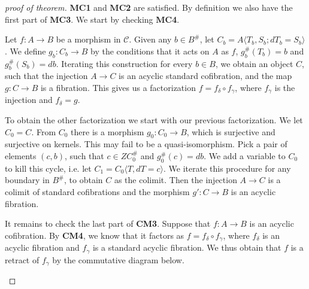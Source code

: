 \documentclass[../thesis.tex]{subfiles}
\begin{document}
            \begin{center}
            \end{center}

            \begin{proof}[proof of theorem]
                \textbf{MC1} and \textbf{MC2} are satisfied. By definition we also have the first part of \textbf{MC3}. We start by checking \textbf{MC4}.

                Let $f:A\rightarrow B$ be a morphism in $\mathcal{C}$. Given any $b\in B^\#$, let $C_b = A\langle T_b,S_b; dT_b = S_b\rangle$. We define $g_b: C_b \rightarrow B$ by the conditions that it acts on $A$ as $f$, $g_b^\#(T_b) = b$ and $g_b^\#(S_b)=db$. Iterating this construction for every $b\in B$, we obtain an object $C$, such that the injection $A \rightarrow C$ is an acyclic standard cofibration, and the map $g : C \rightarrow B$ is a fibration. This gives us a factorization $f = f_\delta\circ f_\gamma$, where $f_\gamma$ is the injection and $f_\delta = g$.

                To obtain the other factorization we start with our previous factorization. We let $C_0 = C$. From $C_0$ there is a morphism $g_0 : C_0 \rightarrow B$, which is surjective and surjective on kernels. This may fail to be a quasi-isomorphism. Pick a pair of elements $(c,b)$, such that $c\in ZC_0^\#$ and $g_0^\#(c) = db$. We add a variable to $C_0$ to kill this cycle, i.e. let $C_1 = C_0\langle T, dT = c\rangle$. We iterate this procedure for any boundary in $B^\#$, to obtain $C$ as the colimit. Then the injection $A \rightarrow C$ is a colimit of standard cofibrations and the morphism $g' : C \rightarrow B$ is an acyclic fibration.
                
                It remains to check the last part of \textbf{CM3}. Suppose that $f:A\rightarrow B$ is an acyclic cofibration. By \textbf{CM4}, we know that it factors as $f = f_\delta \circ f_\gamma$, where $f_\delta$ is an acyclic fibration and $f_\gamma$ is a standard acyclic fibration. We thus obtain that $f$ is a retract of $f_\gamma$ by the commutative diagram below.
                \begin{center}
                \end{center}
            \end{proof}
\end{document}
